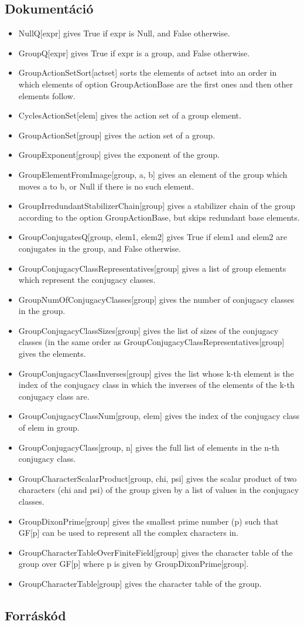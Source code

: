 \subsection{Dokumentáció}
\begin{itemize}
\item NullQ[expr] gives True if expr is Null, and False otherwise.
\item GroupQ[expr] gives True if expr is a group, and False otherwise.
\item GroupActionSetSort[actset] sorts the elements of actset into an order in which elements of option GroupActionBase are the first ones and then other elements follow.
\item CyclesActionSet[elem] gives the action set of a group element.
\item GroupActionSet[group] gives the action set of a group.
\item GroupExponent[group] gives the exponent of the group.
\item GroupElementFromImage[group, a, b] gives an element of the group which moves a to b, or Null if there is no such element.
\item GroupIrredundantStabilizerChain[group] gives a stabilizer chain of the group according to the option GroupActionBase, but skips redundant base elements.
\item GroupConjugatesQ[group, elem1, elem2] gives True if elem1 and elem2 are conjugates in the group, and False otherwise.
\item GroupConjugacyClassRepresentatives[group] gives a list of group elements which represent the conjugacy classes.
\item GroupNumOfConjugacyClasses[group] gives the number of conjugacy classes in the group.
\item GroupConjugacyClassSizes[group] gives the list of sizes of the conjugacy classes (in the same order as GroupConjugacyClassRepresentatives[group] gives the elements.
\item GroupConjugacyClassInverses[group] gives the list whose k-th element is the index of the conjugacy class in which the inverses of the elements of the k-th conjugacy class are.
\item GroupConjugacyClassNum[group, elem] gives the index of the conjugacy class of elem in group.
\item GroupConjugacyClass[group, n] gives the full list of elements in the n-th conjugacy class.
\item GroupCharacterScalarProduct[group, chi, psi] gives the scalar product of two characters (chi and psi) of the group given by a list of values in the conjugacy classes.
\item GroupDixonPrime[group] gives the smallest prime number (p) such that GF[p] can be used to represent all the complex characters in.
\item GroupCharacterTableOverFiniteField[group] gives the character table of the group over GF[p] where p is given by GroupDixonPrime[group].
\item GroupCharacterTable[group] gives the character table of the group.
\end{itemize}

\clearpage
\subsection{Forráskód}
\lstset{
	language=Mathematica,
	tabsize=2,
	breaklines=true,
	showstringspaces=false,
	basicstyle=\footnotesize,
	numbers=left,
	numberstyle=\footnotesize
}

